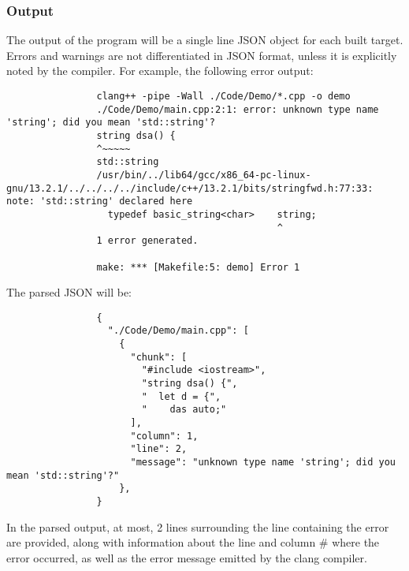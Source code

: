 \documentclass{article}
\begin{document}
		\subsubsection{Output}
			The output of the program will be a single line JSON object for each built target. Errors and warnings are not differentiated in JSON format, unless it is explicitly noted by the compiler. For example, the following error output:
			\begin{verbatim}
				clang++ -pipe -Wall ./Code/Demo/*.cpp -o demo
				./Code/Demo/main.cpp:2:1: error: unknown type name 'string'; did you mean 'std::string'?
				string dsa() {
				^~~~~~
				std::string
				/usr/bin/../lib64/gcc/x86_64-pc-linux-gnu/13.2.1/../../../../include/c++/13.2.1/bits/stringfwd.h:77:33: note: 'std::string' declared here
				  typedef basic_string<char>    string;   
				                                ^
				1 error generated.

				make: *** [Makefile:5: demo] Error 1
			\end{verbatim}
			The parsed JSON will be:
			\begin{verbatim}
				{
				  "./Code/Demo/main.cpp": [
				    {
				      "chunk": [
				        "#include <iostream>",
				        "string dsa() {",
				        "  let d = {",
				        "    das auto;"
				      ],
				      "column": 1,
				      "line": 2,
				      "message": "unknown type name 'string'; did you mean 'std::string'?"
				    },
				}
			\end{verbatim}
			In the parsed output, at most, 2 lines surrounding the line containing the error are provided, along with information about the line and column \# where the error occurred, as well as the error message emitted by the clang compiler. 
\end{document}
